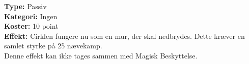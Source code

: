 \begin{ritual*}
\textbf{Type:} Passiv\\
\textbf{Kategori:} Ingen\\
\textbf{Koster:} 10 point\\
\textbf{Effekt:} Cirklen fungere nu som en mur, der skal nedbrydes. Dette kræver en samlet styrke på 25 nævekamp.\\
Denne effekt kan ikke tages sammen med Magisk Beskyttelse.
\end{ritual*}